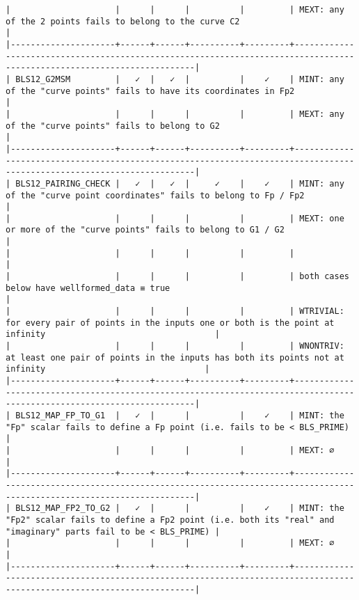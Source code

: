 \documentclass[varwidth=\maxdimen,margin=0.5cm,multi={verbatim}]{standalone}
\begin{document}
\begin{verbatim}
|                     |      |      |          |         | MEXT: any of the 2 points fails to belong to the curve C2                                                              |
|---------------------+------+------+----------+---------+------------------------------------------------------------------------------------------------------------------------|
| BLS12_G2MSM         |   ✓  |   ✓  |          |    ✓    | MINT: any of the "curve points" fails to have its coordinates in Fp2                                                   |
|                     |      |      |          |         | MEXT: any of the "curve points" fails to belong to G2                                                                  |
|---------------------+------+------+----------+---------+------------------------------------------------------------------------------------------------------------------------|
| BLS12_PAIRING_CHECK |   ✓  |   ✓  |     ✓    |    ✓    | MINT: any of the "curve point coordinates" fails to belong to Fp / Fp2                                                 |
|                     |      |      |          |         | MEXT: one or more of the "curve points" fails to belong to G1 / G2                                                     |
|                     |      |      |          |         |                                                                                                                        |
|                     |      |      |          |         | both cases below have wellformed_data ≡ true                                                                           |
|                     |      |      |          |         | WTRIVIAL: for every pair of points in the inputs one or both is the point at infinity                                  |
|                     |      |      |          |         | WNONTRIV: at least one pair of points in the inputs has both its points not at infinity                                |
|---------------------+------+------+----------+---------+------------------------------------------------------------------------------------------------------------------------|
| BLS12_MAP_FP_TO_G1  |   ✓  |      |          |    ✓    | MINT: the "Fp" scalar fails to define a Fp point (i.e. fails to be < BLS_PRIME)                                        |
|                     |      |      |          |         | MEXT: ∅                                                                                                                |
|---------------------+------+------+----------+---------+------------------------------------------------------------------------------------------------------------------------|
| BLS12_MAP_FP2_TO_G2 |   ✓  |      |          |    ✓    | MINT: the "Fp2" scalar fails to define a Fp2 point (i.e. both its "real" and "imaginary" parts fail to be < BLS_PRIME) |
|                     |      |      |          |         | MEXT: ∅                                                                                                                |
|---------------------+------+------+----------+---------+------------------------------------------------------------------------------------------------------------------------|


\end{verbatim}
\end{document}

